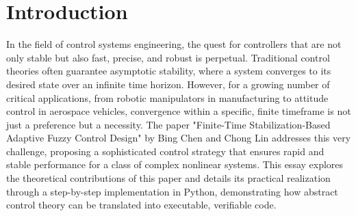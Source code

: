 \FloatBarrier
\section{Introduction}
In the field of control systems engineering, the quest for controllers that are not only stable but also fast, precise, and robust is perpetual. Traditional control theories often guarantee asymptotic stability, where a system converges to its desired state over an infinite time horizon. However, for a growing number of critical applications, from robotic manipulators in manufacturing to attitude control in aerospace vehicles, convergence within a specific, finite timeframe is not just a preference but a necessity. The paper "Finite-Time Stabilization-Based Adaptive Fuzzy Control Design" by Bing Chen and Chong Lin addresses this very challenge, proposing a sophisticated control strategy that ensures rapid and stable performance for a class of complex nonlinear systems. This essay explores the theoretical contributions of this paper and details its practical realization through a step-by-step implementation in Python, demonstrating how abstract control theory can be translated into executable, verifiable code.


